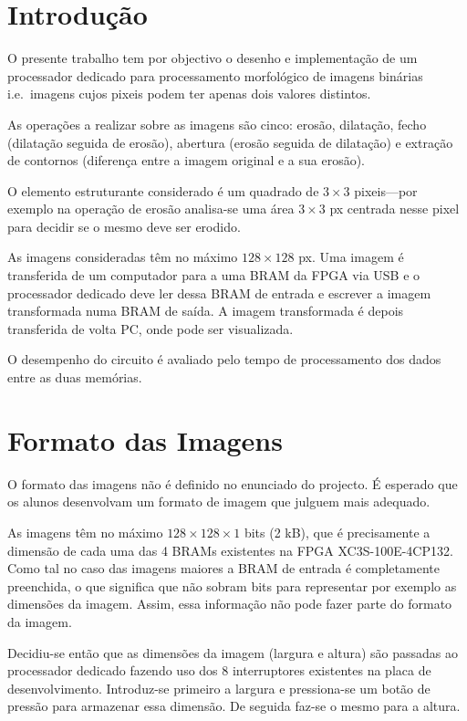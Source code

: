 \documentclass[a4paper]{article}
\begin{document}


\tableofcontents
\pagebreak

\section{Introdução}
O presente trabalho tem por objectivo o desenho e implementação de um processador dedicado para processamento morfológico de imagens binárias i.e.\ imagens cujos pixeis podem ter apenas dois valores distintos.

As operações a realizar sobre as imagens são cinco: erosão, dilatação, fecho (dilatação seguida de erosão), abertura (erosão seguida de dilatação) e extração de contornos (diferença entre a imagem original e a sua erosão).

O elemento estruturante considerado é um quadrado de $3\times3$ pixeis---por exemplo na operação de erosão analisa-se uma área $3\times3$ px centrada nesse pixel para decidir se o mesmo deve ser erodido.

As imagens consideradas têm no máximo $128\times128$ px. Uma imagem é transferida de um computador para a uma BRAM da FPGA via USB e o processador dedicado deve ler dessa BRAM de entrada e escrever a imagem transformada numa BRAM de saída. A imagem transformada é depois transferida de volta PC, onde pode ser visualizada.

O desempenho do circuito é avaliado pelo tempo de processamento dos dados entre as duas memórias.

\section{Formato das Imagens}
O formato das imagens não é definido no enunciado do projecto. É esperado que os alunos desenvolvam um formato de imagem que julguem mais adequado.

As imagens têm no máximo $128\times128\times1$ bits (2 kB), que é precisamente a dimensão de cada uma das 4 BRAMs existentes na FPGA XC3S-100E-4CP132. Como tal no caso das imagens maiores a BRAM de entrada é completamente preenchida, o que significa que não sobram bits para representar por exemplo as dimensões da imagem. Assim, essa informação não pode fazer parte do formato da imagem.

Decidiu-se então que as dimensões da imagem (largura e altura) são passadas ao processador dedicado fazendo uso dos 8 interruptores existentes na placa de desenvolvimento. Introduz-se primeiro a largura e pressiona-se um botão de pressão para armazenar essa dimensão. De seguida faz-se o mesmo para a altura.
\end{document}
